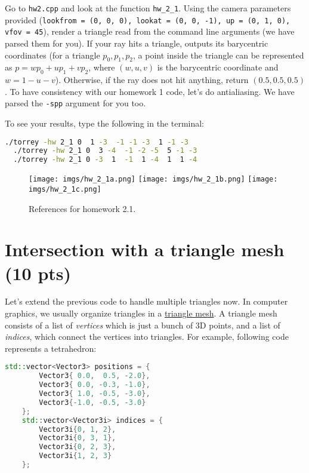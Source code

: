 Go to \lstinline{hw2.cpp} and look at the function \lstinline{hw_2_1}. Using the camera parameters provided (\lstinline{lookfrom = (0, 0, 0), lookat = (0, 0, -1), up = (0, 1, 0), vfov = 45}), render a triangle read from the command line arguments (we have parsed them for you). If your ray hits a triangle, outputs its barycentric coordinates (for a triangle $p_0, p_1, p_2$, a point inside the triangle can be represented as $p = w p_0 + u p_1 + v p_2$, where $(w, u, v)$ is the barycentric coordinate and $w = 1 - u - v$). Otherwise, if the ray does not hit anything, return $(0.5, 0.5, 0.5)$. To have consistency with our homework 1 code, let's do antialiasing. We have parsed the \lstinline{-spp} argument for you too.

To see your results, type the following in the terminal:
\begin{lstlisting}[language=bash]
  ./torrey -hw 2_1 0  1 -3  -1 -1 -3  1 -1 -3
  ./torrey -hw 2_1 0  3 -4  -1 -2 -5  5 -1 -3
  ./torrey -hw 2_1 0 -3  1  -1  1 -4  1  1 -4
\end{lstlisting}

\begin{figure}[ht]
    \centering
    \texttt{[image: imgs/hw\_2\_1a.png]}
    \texttt{[image: imgs/hw\_2\_1b.png]}
    \texttt{[image: imgs/hw\_2\_1c.png]}
    \caption{References for homework 2.1.}
    \label{fig:hw_2_1}
\end{figure}

\section{Intersection with a triangle mesh (10 pts)}
Let's extend the previous code to handle multiple triangles now. In computer graphics, we usually organize triangles in a \href{https://en.wikipedia.org/wiki/Triangle_mesh}{triangle mesh}. A triangle mesh consists of a list of \emph{vertices} which is just a bunch of 3D points, and a list of \emph{indices}, which connect the vertices into triangles. For example, following code represents a tetrahedron:
\begin{lstlisting}[language=C++]
    std::vector<Vector3> positions = {
        Vector3{ 0.0,  0.5, -2.0},
        Vector3{ 0.0, -0.3, -1.0},
        Vector3{ 1.0, -0.5, -3.0},
        Vector3{-1.0, -0.5, -3.0}
    };
    std::vector<Vector3i> indices = {
        Vector3i{0, 1, 2},
        Vector3i{0, 3, 1},
        Vector3i{0, 2, 3},
        Vector3i{1, 2, 3}
    };
\end{lstlisting}

